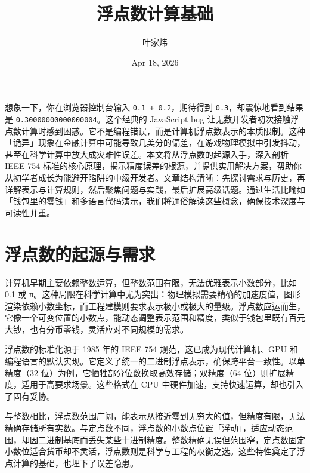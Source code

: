 \title{浮点数计算基础}
\author{叶家炜}
\date{Apr 18, 2026}
\maketitle
想象一下，你在浏览器控制台输入 \texttt{0.1 + 0.2}，期待得到 \texttt{0.3}，却震惊地看到结果是 \texttt{0.30000000000000004}。这个经典的 JavaScript bug 让无数开发者初次接触浮点数计算时感到困惑。它不是编程错误，而是计算机浮点数表示的本质限制。这种「诡异」现象在金融计算中可能导致几美分的偏差，在游戏物理模拟中引发抖动，甚至在科学计算中放大成灾难性误差。本文将从浮点数的起源入手，深入剖析 IEEE 754 标准的核心原理，揭示精度误差的根源，并提供实用解决方案，帮助你从初学者成长为能避开陷阱的中级开发者。文章结构清晰：先探讨需求与历史，再详解表示与计算规则，然后聚焦问题与实践，最后扩展高级话题。通过生活比喻如「钱包里的零钱」和多语言代码演示，我们将通俗解读这些概念，确保技术深度与可读性并重。\par
\chapter{浮点数的起源与需求}
计算机早期主要依赖整数运算，但整数范围有限，无法优雅表示小数部分，比如 0.1 或 π。这种局限在科学计算中尤为突出：物理模拟需要精确的加速度值，图形渲染依赖小数坐标，而工程建模则要求表示极小或极大的量级。浮点数应运而生，它像一个可变位置的小数点，能动态调整表示范围和精度，类似于钱包里既有百元大钞，也有分币零钱，灵活应对不同规模的需求。\par
浮点数的标准化源于 1985 年的 IEEE 754 规范，这已成为现代计算机、GPU 和编程语言的默认实现。它定义了统一的二进制浮点表示，确保跨平台一致性。以单精度（32 位）为例，它牺牲部分位数换取高效存储；双精度（64 位）则扩展精度，适用于高要求场景。这些格式在 CPU 中硬件加速，支持快速运算，却也引入了固有妥协。\par
与整数相比，浮点数范围广阔，能表示从接近零到无穷大的值，但精度有限，无法精确存储所有实数。与定点数不同，浮点数的小数点位置「浮动」，适应动态范围，却因二进制基底而丢失某些十进制精度。整数精确无误但范围窄，定点数固定小数位适合货币却不灵活，浮点数则是科学与工程的权衡之选。这些特性奠定了浮点计算的基础，也埋下了误差隐患。\par
